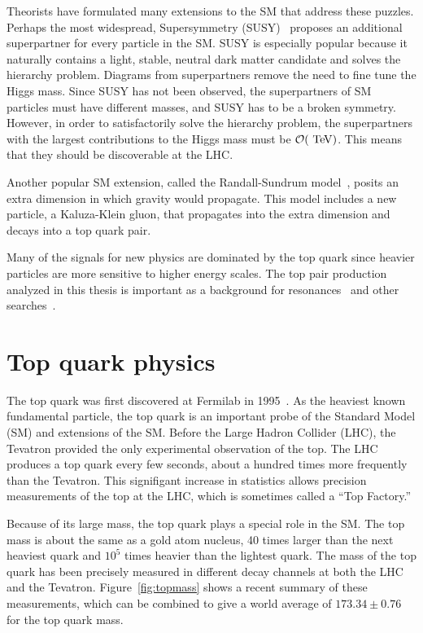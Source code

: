 Theorists have formulated many extensions to the SM that address these puzzles. Perhaps the most widespread, Supersymmetry (SUSY)~\cite{susy} proposes an additional superpartner for every particle in the SM. SUSY is especially popular because it naturally contains a light, stable, neutral dark matter candidate and solves the hierarchy problem. Diagrams from superpartners remove the need to fine tune the Higgs mass. Since SUSY has not been observed, the superpartners of SM particles must have different masses, and SUSY has to be a broken symmetry. However, in order to satisfactorily solve the hierarchy problem, the superpartners with the largest contributions to the Higgs mass must be $\mathcal{O}(\tev)$. This means that they should be discoverable at the LHC.

Another popular SM extension, called the Randall-Sundrum model~\cite{Lillie:2007yh}, posits an extra dimension in which gravity would propagate. This model includes a new particle, a Kaluza-Klein gluon, that propagates into the extra dimension and decays into a top quark pair.

Many of the signals for new physics are dominated by the top quark since heavier particles are more sensitive to higher energy scales.  The top pair production analyzed in this thesis is important as a background for \ttbar resonances~\cite{ATLAS-CONF-2015-009} and other searches~\cite{Aad:2014kra}.


\section{Top quark physics}
The top quark was first discovered at Fermilab in 1995~\cite{Abe:1995hr}\cite{Abachi:1995iq}. As the heaviest known fundamental particle, the top quark is an important probe of the Standard Model (SM) and extensions of the SM. Before the Large Hadron Collider (LHC), the Tevatron provided the only experimental observation of the top. The LHC produces a top quark every few seconds, about a hundred times more frequently than the Tevatron. This signifigant increase in statistics allows precision measurements of the top at the LHC, which is sometimes called a ``Top Factory.'' 

Because of its large mass, the top quark plays a special role in the SM. The top mass is about the same as a gold atom nucleus, 40 times larger than the next heaviest quark and $10^5$ times heavier than the lightest quark. The mass of the top quark has been precisely measured in different decay channels at both the LHC and the Tevatron. Figure~\ref{fig:topmass} shows a recent summary of these measurements, which can be combined to give a world average of $173.34 \pm 0.76$ for the top quark mass.

